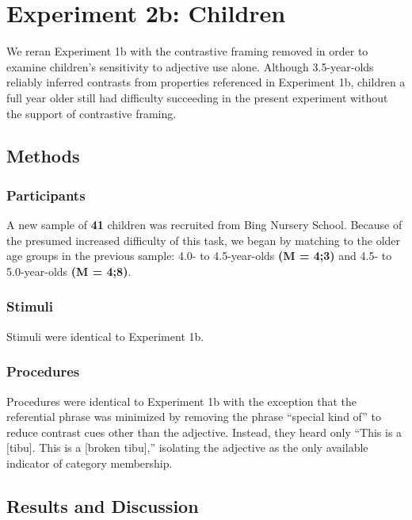 \documentclass[10pt,letterpaper]{article}
\begin{document}
\section{Experiment 2b: Children} 

We reran Experiment 1b with the contrastive framing removed in order to examine children's sensitivity to adjective use alone. Although 3.5-year-olds reliably inferred contrasts from properties referenced in Experiment 1b, children a full year older still had difficulty succeeding in the present experiment without the support of contrastive framing.  

\subsection{Methods}

\subsubsection{Participants}

A new sample of \textbf{41} children was recruited from Bing Nursery School.  Because of the presumed increased difficulty of this task, we began by matching to the older age groups in the previous sample: 4.0- to 4.5-year-olds \textbf{(M = 4;3)} and 4.5- to 5.0-year-olds \textbf{(M = 4;8)}.

\subsubsection{Stimuli}

Stimuli were identical to Experiment 1b. 

\subsubsection{Procedures}

Procedures were identical to Experiment 1b with the exception that the referential phrase was minimized by removing the phrase ``special kind of'' to reduce contrast cues other than the adjective.  Instead, they heard only ``This is a [tibu]. This is a [broken tibu],'' isolating the adjective as the only available indicator of category membership.

\subsection{Results and Discussion}
\end{document}

